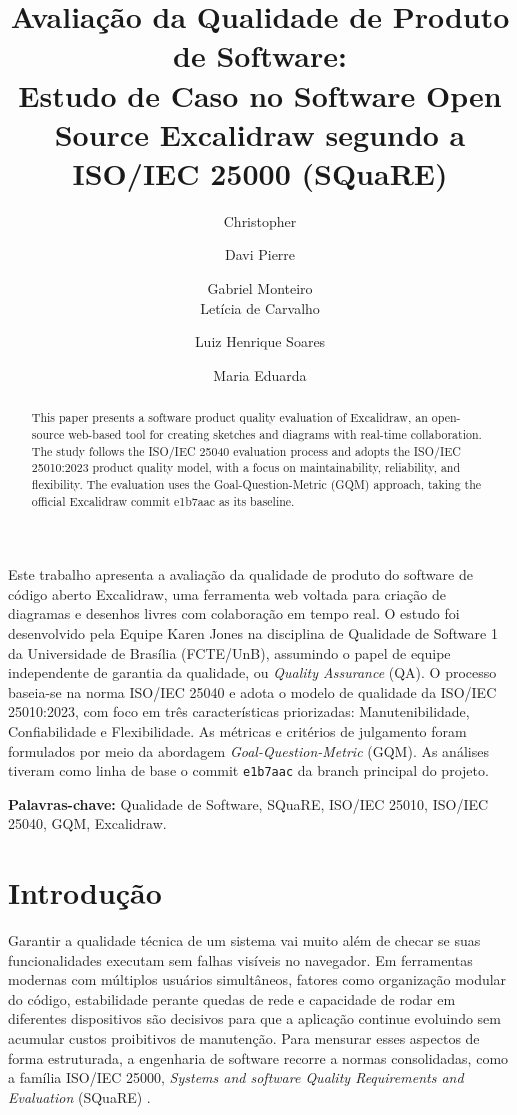 \documentclass[12pt]{article}
\title{Avaliação da Qualidade de Produto de Software:\\
Estudo de Caso no Software Open Source Excalidraw segundo a ISO/IEC 25000 (SQuaRE)}
\author{Christopher\inst{1} \and Davi Pierre\inst{1} \and Gabriel Monteiro\inst{1} \\
        Letícia de Carvalho\inst{1} \and Luiz Henrique Soares\inst{1} \and Maria Eduarda\inst{1}}
\begin{document}
\maketitle

\begin{abstract}
This paper presents a software product quality evaluation of Excalidraw, an open-source web-based tool for creating sketches and diagrams with real-time collaboration. The study follows the ISO/IEC 25040 evaluation process and adopts the ISO/IEC 25010:2023 product quality model, with a focus on maintainability, reliability, and flexibility. The evaluation uses the Goal-Question-Metric (GQM) approach, taking the official Excalidraw commit e1b7aac as its baseline.
\end{abstract}

\begin{resumo}
Este trabalho apresenta a avaliação da qualidade de produto do software de código aberto Excalidraw, uma ferramenta web voltada para criação de diagramas e desenhos livres com colaboração em tempo real. O estudo foi desenvolvido pela Equipe Karen Jones na disciplina de Qualidade de Software 1 da Universidade de Brasília (FCTE/UnB), assumindo o papel de equipe independente de garantia da qualidade, ou \textit{Quality Assurance} (QA). O processo baseia-se na norma ISO/IEC 25040 e adota o modelo de qualidade da ISO/IEC 25010:2023, com foco em três características priorizadas: Manutenibilidade, Confiabilidade e Flexibilidade. As métricas e critérios de julgamento foram formulados por meio da abordagem \textit{Goal-Question-Metric} (GQM). As análises tiveram como linha de base o commit \texttt{e1b7aac} da branch principal do projeto.

\end{resumo}

\noindent\textbf{Palavras-chave:} Qualidade de Software, SQuaRE, ISO/IEC 25010, ISO/IEC 25040, GQM, Excalidraw.

\section{Introdução}

Garantir a qualidade técnica de um sistema vai muito além de checar se suas funcionalidades executam sem falhas visíveis no navegador. Em ferramentas modernas com múltiplos usuários simultâneos, fatores como organização modular do código, estabilidade perante quedas de rede e capacidade de rodar em diferentes dispositivos são decisivos para que a aplicação continue evoluindo sem acumular custos proibitivos de manutenção. Para mensurar esses aspectos de forma estruturada, a engenharia de software recorre a normas consolidadas, como a família ISO/IEC 25000, \textit{Systems and software Quality Requirements and Evaluation} (SQuaRE) \cite{iso25000}.
\end{document}
